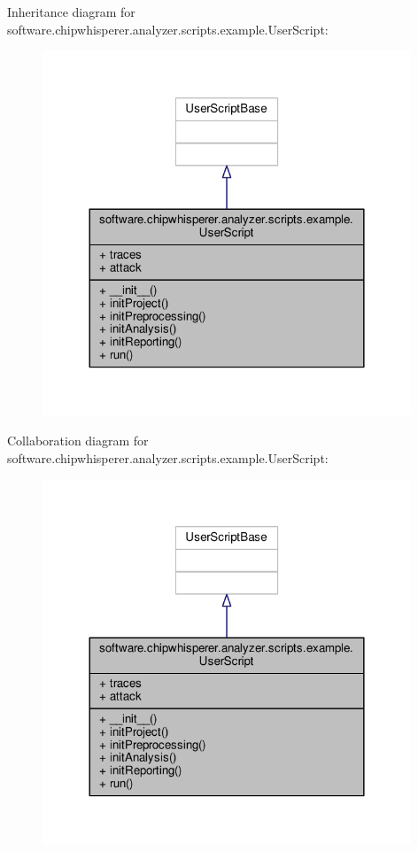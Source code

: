 Inheritance diagram for software.\+chipwhisperer.\+analyzer.\+scripts.\+example.\+User\+Script\+:\nopagebreak
\begin{figure}[H]
\begin{center}
\leavevmode
\includegraphics[width=312pt]{d0/dac/classsoftware_1_1chipwhisperer_1_1analyzer_1_1scripts_1_1example_1_1UserScript__inherit__graph}
\end{center}
\end{figure}


Collaboration diagram for software.\+chipwhisperer.\+analyzer.\+scripts.\+example.\+User\+Script\+:\nopagebreak
\begin{figure}[H]
\begin{center}
\leavevmode
\includegraphics[width=312pt]{d0/dc7/classsoftware_1_1chipwhisperer_1_1analyzer_1_1scripts_1_1example_1_1UserScript__coll__graph}
\end{center}
\end{figure}


